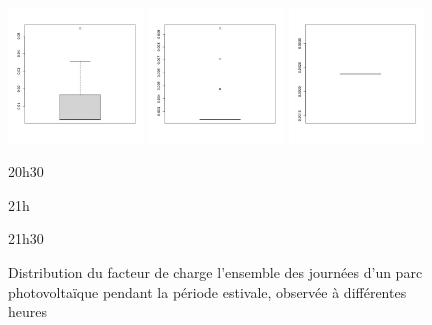 \begin{figure}[H]
\begin{minipage}{\linewidth}
	\end{minipage}
	\begin{minipage}{\linewidth}
		\centering
		\includegraphics[width=0.32\textwidth]{Images/pv_pre/20:30:00.jpg}
		\includegraphics[width=0.32\textwidth]{Images/pv_pre/21:00:00.jpg}
		\includegraphics[width=0.32\textwidth]{Images/pv_pre/21:30:00.jpg}
	\end{minipage}
	\begin{minipage}{0.32\textwidth}
		\centering
		20h30
	\end{minipage}
	\begin{minipage}{0.32\textwidth}
		\centering
		21h
	\end{minipage}
	\begin{minipage}{0.32\textwidth}
		\centering
		21h30
	\end{minipage}
	\caption{Distribution du facteur de charge l'ensemble des journées d'un parc photovoltaïque pendant la période estivale, observée à différentes heures}
	\label{fig:boxplot_pv_journee}
\end{figure}
